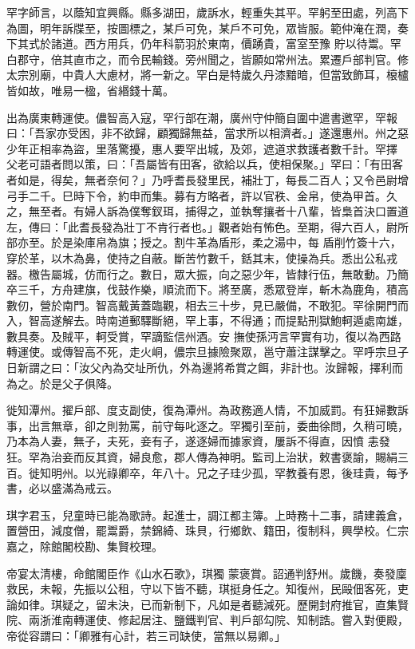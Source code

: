 \begin{pinyinscope}
 罕字師言，以蔭知宜興縣。縣多湖田，歲訴水，輕重失其平。罕躬至田處，列高下為圖，明年訴牒至，按圖標之，某戶可免，某戶不可免，眾皆服。範仲淹在潤，奏下其式於諸道。西方用兵，仍年科箭羽於東南，價踴貴，富室至豫
 貯以待鬻。罕白郡守，倍其直市之，而令民輸錢。旁州聞之，皆願如常州法。累遷戶部判官。修太宗別廟，中貴人大慮材，將一新之。罕白是特歲久丹漆黯暗，但當致飾耳，榱櫨皆如故，唯易一楹，省緡錢十萬。



 出為廣東轉運使。儂智高入寇，罕行部在潮，廣州守仲簡自圍中遣書邀罕，罕報曰：「吾家亦受困，非不欲歸，顧獨歸無益，當求所以相濟者。」遂還惠州。州之惡少年正相率為盜，里落驚擾，惠人要罕出城，及郊，遮道求救護者數千計。罕擇
 父老可語者問以策，曰：「吾屬皆有田客，欲給以兵，使相保聚。」罕曰：「有田客者如是，得矣，無者奈何？」乃呼耆長發里民，補壯丁，每長二百人；又令邑尉增弓手二千。巳時下令，約申而集。募有方略者，許以官秩、金帛，使為甲首。久之，無至者。有婦人訴為僕奪釵珥，捕得之，並執奪攘者十八輩，皆梟首決口置道左，傳曰：「此耆長發為壯丁不肯行者也。」觀者始有怖色。至期，得六百人，尉所部亦至。於是染庫帛為旗；授之。割牛革為盾形，柔之湯中，每
 盾削竹簽十六，穿於革，以木為鼻，使持之自蔽。斷苦竹數千，銛其末，使操為兵。悉出公私戎器。檄告屬城，仿而行之。數日，眾大振，向之惡少年，皆隸行伍，無敢動。乃簡卒三千，方舟建旗，伐鼓作樂，順流而下。將至廣，悉眾登岸，斬木為鹿角，積高數仞，營於南門。智高戴黃蓋臨觀，相去三十步，見已嚴備，不敢犯。罕徐開門而入，智高遂解去。時南道郵驛斷絕，罕上事，不得通；而提點刑獄鮑軻遁處南雄，數具奏。及賊平，軻受賞，罕謫監信州酒。安
 撫使孫沔言罕實有功，復以為西路轉運使。或傳智高不死，走火峒，儂宗旦據險聚眾，邕守蕭注謀擊之。罕呼宗旦子日新謂之曰：「汝父內為交址所仇，外為邊將希賞之餌，非計也。汝歸報，擇利而為之。於是父子俱降。



 徙知潭州。擢戶部、度支副使，復為潭州。為政務適人情，不加威罰。有狂婦數訴事，出言無章，卻之則勃罵，前守每叱逐之。罕獨引至前，委曲徐問，久稍可曉，乃本為人妻，無子，夫死，妾有子，遂逐婦而據家資，屢訴不得直，因憤
 恚發狂。罕為治妾而反其資，婦良愈，郡人傳為神明。監司上治狀，敕書褒諭，賜絹三百。徙知明州。以光祿卿卒，年八十。兄之子珪少孤，罕教養有恩，後珪貴，每予書，必以盛滿為戒云。



 琪字君玉，兒童時已能為歌詩。起進士，調江都主簿。上時務十二事，請建義倉，置營田，減度僧，罷鬻爵，禁錦綺、珠貝，行鄉飲、籍田，復制科，興學校。仁宗嘉之，除館閣校勘、集賢校理。



 帝宴太清樓，命館閣臣作《山水石歌》，琪獨
 蒙褒賞。詔通判舒州。歲饑，奏發廩救民，未報，先振以公租，守以下皆不聽，琪挺身任之。知復州，民毆佃客死，吏論如律。琪疑之，留未決，已而新制下，凡如是者聽減死。歷開封府推官，直集賢院、兩浙淮南轉運使、修起居注、鹽鐵判官、判戶部勾院、知制誥。嘗入對便殿，帝從容謂曰：「卿雅有心計，若三司缺使，當無以易卿。」




\end{pinyinscope}
